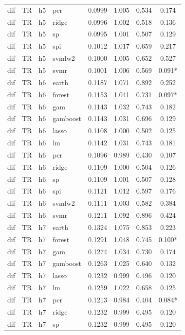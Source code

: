 \begin{ThreePartTable}
\begin{longtable}[t]{llclcccc}
dif & TR & h5 & pcr & 0.0999 & 1.005 & 0.534 & 0.174\\
dif & TR & h5 & ridge & 0.0996 & 1.002 & 0.518 & 0.136\\
dif & TR & h5 & sp & 0.0995 & 1.001 & 0.507 & 0.129\\
dif & TR & h5 & spi & 0.1012 & 1.017 & 0.659 & 0.217\\
dif & TR & h5 & svmlw2 & 0.1000 & 1.005 & 0.652 & 0.527\\
dif & TR & h5 & svmr & 0.1001 & 1.006 & 0.569 & 0.091*\\
\addlinespace
dif & TR & h6 & earth & 0.1187 & 1.071 & 0.892 & 0.252\\
dif & TR & h6 & forest & 0.1153 & 1.041 & 0.731 & 0.097*\\
dif & TR & h6 & gam & 0.1143 & 1.032 & 0.743 & 0.182\\
dif & TR & h6 & gamboost & 0.1143 & 1.031 & 0.696 & 0.129\\
dif & TR & h6 & lasso & 0.1108 & 1.000 & 0.502 & 0.125\\
dif & TR & h6 & lm & 0.1142 & 1.031 & 0.743 & 0.181\\
dif & TR & h6 & pcr & 0.1096 & 0.989 & 0.430 & 0.107\\
dif & TR & h6 & ridge & 0.1109 & 1.000 & 0.504 & 0.126\\
dif & TR & h6 & sp & 0.1109 & 1.001 & 0.507 & 0.128\\
dif & TR & h6 & spi & 0.1121 & 1.012 & 0.597 & 0.176\\
dif & TR & h6 & svmlw2 & 0.1111 & 1.003 & 0.582 & 0.384\\
dif & TR & h6 & svmr & 0.1211 & 1.092 & 0.896 & 0.424\\
\addlinespace
dif & TR & h7 & earth & 0.1324 & 1.075 & 0.853 & 0.223\\
dif & TR & h7 & forest & 0.1291 & 1.048 & 0.745 & 0.100*\\
dif & TR & h7 & gam & 0.1274 & 1.034 & 0.730 & 0.174\\
dif & TR & h7 & gamboost & 0.1263 & 1.025 & 0.640 & 0.132\\
dif & TR & h7 & lasso & 0.1232 & 0.999 & 0.496 & 0.120\\
dif & TR & h7 & lm & 0.1259 & 1.022 & 0.658 & 0.125\\
dif & TR & h7 & pcr & 0.1213 & 0.984 & 0.404 & 0.084*\\
dif & TR & h7 & ridge & 0.1232 & 0.999 & 0.495 & 0.120\\
dif & TR & h7 & sp & 0.1232 & 0.999 & 0.495 & 0.120\\

\end{longtable}
\end{ThreePartTable}

